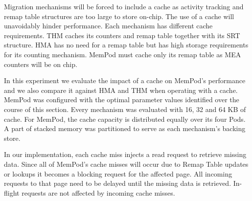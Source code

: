 Migration mechanisms will be forced to include a cache as activity tracking and remap table structures are too large to store on-chip. The use of a cache will unavoidably hinder performance. Each mechanism has different cache requirements. THM caches its counters and remap table together with its SRT structure. HMA has no need for a remap table but has high storage requirements for its counting mechanism. MemPod must cache only its remap table as MEA counters will be on chip. 

In this experiment we evaluate the impact of a cache on MemPod's performance and we also compare it against HMA and THM when operating with a cache. MemPod was configured with the optimal parameter values identified over the course of this section. Every mechanism was evaluated with 16, 32 and 64 KB of cache. For MemPod, the cache capacity is distributed equally over its four Pods. A part of stacked memory was partitioned to serve as each mechanism's backing store.

In our implementation, each cache miss injects a read request to retrieve missing data. Since all of MemPod's cache misses will occur due to Remap Table updates or lookups it becomes a blocking request for the affected page. All incoming requests to that page need to be delayed until the missing data is retrieved. In-flight requests are not affected by incoming cache misses.

